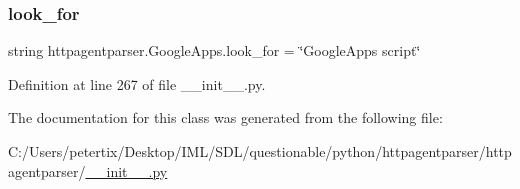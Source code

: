 \hypertarget{classhttpagentparser_1_1_google_apps_a30b409fc11397ff71fe1971aabf40ac5}{}\label{classhttpagentparser_1_1_google_apps_a30b409fc11397ff71fe1971aabf40ac5} 
\subsubsection{\texorpdfstring{look\+\_\+for}{look\_for}}
{\footnotesize\ttfamily string httpagentparser.\+Google\+Apps.\+look\+\_\+for = \char`\"{}Google\+Apps script\char`\"{}\hspace{0.3cm}{\ttfamily [static]}}



Definition at line 267 of file \+\_\+\+\_\+init\+\_\+\+\_\+.\+py.



The documentation for this class was generated from the following file\+:\begin{DoxyCompactItemize}
\item 
C\+:/\+Users/petertix/\+Desktop/\+I\+M\+L/\+S\+D\+L/questionable/python/httpagentparser/httpagentparser/\hyperlink{____init_____8py}{\+\_\+\+\_\+init\+\_\+\+\_\+.\+py}\end{DoxyCompactItemize}
